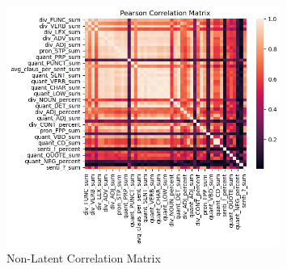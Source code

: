 \documentclass{article}
\begin{document}
\label{appendix:correlation-matrx}
\begin{figure}[H]
  \centering
  \includegraphics[width=0.8\textwidth]{img/non_latent_corr_matrx.png}
  \caption{Non-Latent Correlation Matrix}
\end{figure}

\label{apppendix:machine-learning}
\end{document}
